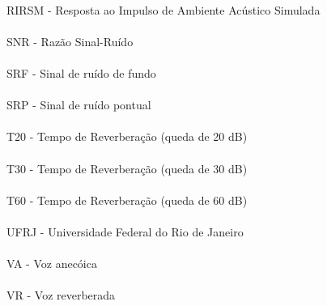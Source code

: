 \paragraph{}RIRSM - Resposta ao Impulso de Ambiente Acústico Simulada
\paragraph{}SNR - Razão Sinal-Ruído
\paragraph{}SRF - Sinal de ruído de fundo
\paragraph{}SRP - Sinal de ruído pontual
\paragraph{}T20 - Tempo de Reverberação (queda de 20 dB)
\paragraph{}T30 - Tempo de Reverberação (queda de 30 dB)
\paragraph{}T60 - Tempo de Reverberação (queda de 60 dB)
\paragraph{}UFRJ - Universidade Federal do Rio de Janeiro 
\paragraph{}VA - Voz anecóica
\paragraph{}VR - Voz reverberada


\pagebreak







